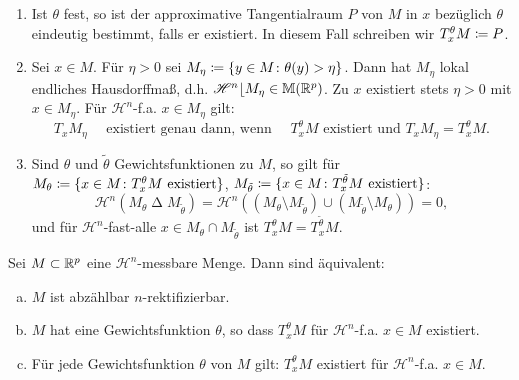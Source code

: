 \documentclass[a4paper,twoside,DIV15,BCOR12mm]{scrbook}
\newcommand{\HM}{\mathscr H}
\newcommand{\MR}{\lfloor}
\begin{document}
\begin{bemerkungen}
\begin{enumerate}[(1)]
\item Ist \(\theta\) fest, so ist der approximative Tangentialraum \(P\) von \(M\) in \(x\) bezüglich \(\theta\) eindeutig bestimmt, falls er existiert. In diesem Fall schreiben wir \(T_x^\theta M \da P\).
\item Sei \(x\in M\). Für \(\eta>0\) sei \(M_\eta \da \{y\in M \colon \theta(y) > \eta\}\). Dann hat \(M_\eta\) lokal endliches Hausdorffmaß, d.h. \(\HM^n\MR M_\eta \in \mathbb M(\MdR^p)\). Zu \(x\) existiert stets \(\eta>0\) mit \(x \in M_\eta\). Für \(\HM^n\)-f.a. \(x\in M_\eta\) gilt:
\[
T_x M_\eta \quad \text{ existiert genau dann, wenn } \quad T_x^\theta M \text{ existiert und } T_x M_\eta = T_x^\theta M.
\]
\item Sind \(\theta\) und \(\tilde\theta\) Gewichtsfunktionen zu \(M\), so gilt für \(M_\theta \da \{x\in M \colon T_x^\theta M \text{ existiert}\}\), \(M_{\tilde\theta} \da \{x\in M \colon T_x^{\tilde\theta} M 
\text{ existiert}\}\):
\[
\HM^n(M_\theta \mathop\Delta M_{\tilde\theta}) = \HM^n\left( (M_\theta \setminus M_{\tilde\theta}) \cup (M_{\tilde\theta} \setminus M_\theta) \right) = 0,
\]
und für \(\HM^n\)-fast-alle \(x \in M_\theta \cap M_{\tilde\theta}\) ist \(T_x^\theta M = T_x^{\tilde\theta}M\).
\end{enumerate}
\end{bemerkungen}

\begin{satz}\label{satz:3.24}
Sei \(M \subset \mathbb{R}^p\) eine \(\HM^n\)-messbare Menge. Dann sind äquivalent:
\begin{enumerate}[(a)]
\item \(M\) ist abzählbar \(n\)-rektifizierbar.
\item \(M\) hat eine Gewichtsfunktion \(\theta\), so dass \(T_x^\theta M\) für \(\HM^n\)-f.a. \(x \in M\) existiert.
\item Für jede Gewichtsfunktion \(\theta\) von \(M\) gilt: \(T_x^\theta M\) existiert für \(\HM^n\)-f.a. \(x\in M\).
\end{enumerate}
\end{satz}
\end{document}
